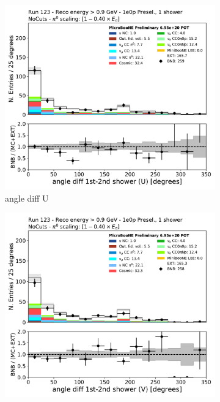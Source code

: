 \begin{figure}[H]
    \centering
    \begin{subfigure}{0.3\textwidth}
    \includegraphics[width=1.0\textwidth]{1e0p/High_E_Sideband/anglediff_U.pdf}
    \caption{angle diff U}
    \end{subfigure}
    \begin{subfigure}{0.3\textwidth}
    \includegraphics[width=1.0\textwidth]{1e0p/High_E_Sideband/anglediff_V.pdf}

\end{subfigure}
\end{figure}
